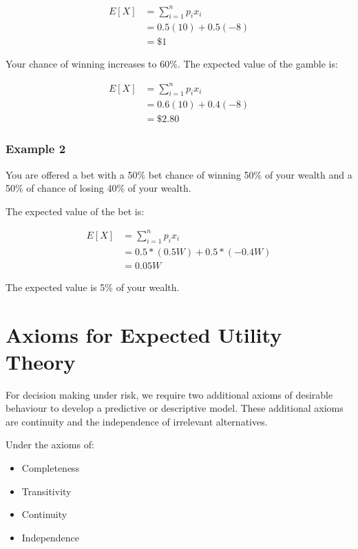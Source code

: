 \documentclass[
  letterpaper,
  DIV=11,
  numbers=noendperiod]{scrreprt}
\providecommand{\tightlist}{%
  \setlength{\itemsep}{0pt}\setlength{\parskip}{0pt}}\usepackage{longtable,booktabs,array}
\begin{document}
\begin{align*}
E[X]&=\sum_{i=1}^n p_ix_i \\[6pt]
&=0.5(10)+0.5(-8) \\[6pt]
&=\$1
\end{align*}

\newpage

Your chance of winning increases to 60\%. The expected value of the
gamble is:

\begin{align*}
E[X]&=\sum_{i=1}^n p_ix_i \\[6pt]
&=0.6(10)+0.4(-8) \\[6pt]
&=\$2.80
\end{align*}

\hypertarget{example-2}{%
\subsection{Example 2}\label{example-2}}

You are offered a bet with a 50\% bet chance of winning 50\% of your
wealth and a 50\% of chance of losing 40\% of your wealth.

The expected value of the bet is:

\begin{align*}
E[X]&=\sum_{i=1}^n p_ix_i \\[6pt]
&=0.5*(0.5W)+0.5*(-0.4W) \\[6pt]
&=0.05W
\end{align*}

The expected value is 5\% of your wealth.

\hypertarget{axioms-for-expected-utility-theory}{%
\chapter{Axioms for Expected Utility
Theory}\label{axioms-for-expected-utility-theory}}

For decision making under risk, we require two additional axioms of
desirable behaviour to develop a predictive or descriptive model. These
additional axioms are continuity and the independence of irrelevant
alternatives.

Under the axioms of:

\begin{itemize}
\tightlist
\item
  Completeness
\item
  Transitivity
\item
  Continuity
\item
  Independence
\end{itemize}
\end{document}
